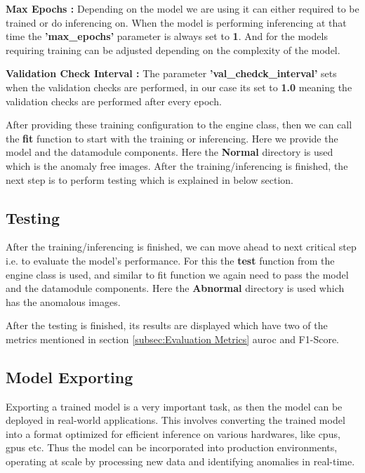\textbf{Max Epochs :} Depending on the model we are using it can either required to be trained or do inferencing on. When the model is performing inferencing at that time the \textbf{'max\_epochs'} parameter is always set to \textbf{1}. And for the models requiring training can be adjusted depending on the complexity of the model.%

\textbf{Validation Check Interval :} The parameter \textbf{'val\_chedck\_interval'} sets when the validation checks are performed, in our case its set to \textbf{1.0} meaning the validation checks are performed after every epoch.

After providing these training configuration to the engine class, then we can call the \textbf{fit} function to start with the training or inferencing. Here we provide the model and the datamodule components. Here the \textbf{Normal} directory is used which is the anomaly free images. After the training/inferencing is finished, the next step is to perform testing which is explained in below section.

\subsection{Testing}

After the training/inferencing is finished, we can move ahead to next critical step i.e. to evaluate the model's performance. For this the \textbf{test} function from the engine class is used, and similar to fit function we again need to pass the model and the datamodule components. Here the \textbf{Abnormal} directory is used which has the anomalous images. 

After the testing is finished, its results are displayed which have two of the metrics mentioned in section \ref{subsec:Evaluation Metrics} \gls{auroc} and F1-Score.

\subsection{Model Exporting}
\label{subsec:Model Exporting}

Exporting a trained model is a very important task, as then the model can be deployed in real-world applications. This involves converting the trained model into a format optimized for efficient inference on various hardwares, like \glspl{cpu}, \glspl{gpu} etc. Thus the model can be incorporated into production environments, operating at scale by processing new data and identifying anomalies in real-time.

